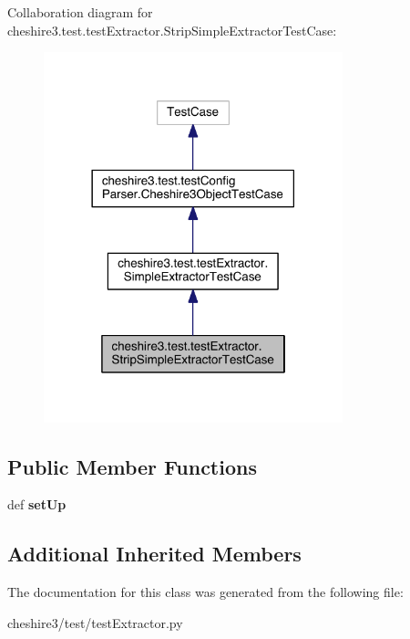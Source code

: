 Collaboration diagram for cheshire3.\-test.\-test\-Extractor.\-Strip\-Simple\-Extractor\-Test\-Case\-:
\nopagebreak
\begin{figure}[H]
\begin{center}
\leavevmode
\includegraphics[width=246pt]{classcheshire3_1_1test_1_1test_extractor_1_1_strip_simple_extractor_test_case__coll__graph}
\end{center}
\end{figure}
\subsection*{Public Member Functions}
\begin{DoxyCompactItemize}
\item 
\hypertarget{classcheshire3_1_1test_1_1test_extractor_1_1_strip_simple_extractor_test_case_a9fb9d84ff7a2d8fe62e98cfa85fdbdd1}{def {\bfseries set\-Up}}\label{classcheshire3_1_1test_1_1test_extractor_1_1_strip_simple_extractor_test_case_a9fb9d84ff7a2d8fe62e98cfa85fdbdd1}

\end{DoxyCompactItemize}
\subsection*{Additional Inherited Members}


The documentation for this class was generated from the following file\-:\begin{DoxyCompactItemize}
\item 
cheshire3/test/test\-Extractor.\-py\end{DoxyCompactItemize}
